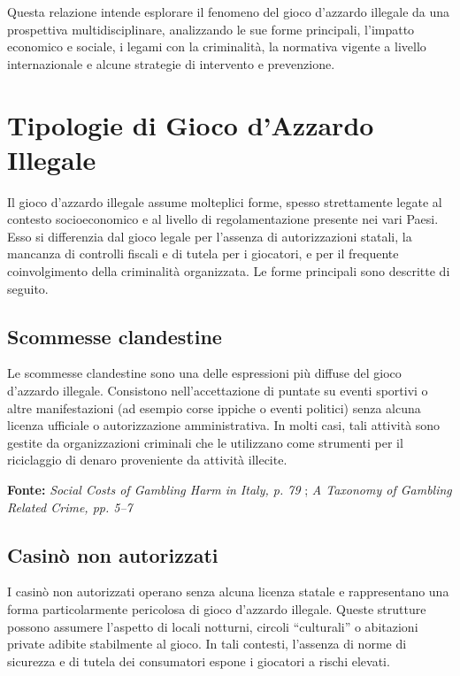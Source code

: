 \documentclass[a4paper,12pt]{article}
\begin{document}
Questa relazione intende esplorare il fenomeno del gioco d’azzardo illegale da una prospettiva multidisciplinare, analizzando le sue forme principali, l’impatto economico e sociale, i legami con la criminalità, la normativa vigente a livello internazionale e alcune strategie di intervento e prevenzione.





\section{Tipologie di Gioco d'Azzardo Illegale}

Il gioco d'azzardo illegale assume molteplici forme, spesso strettamente legate al contesto socioeconomico e al livello di regolamentazione presente nei vari Paesi. Esso si differenzia dal gioco legale per l’assenza di autorizzazioni statali, la mancanza di controlli fiscali e di tutela per i giocatori, e per il frequente coinvolgimento della criminalità organizzata. Le forme principali sono descritte di seguito.

\subsection{Scommesse clandestine}

Le scommesse clandestine sono una delle espressioni più diffuse del gioco d’azzardo illegale. Consistono nell’accettazione di puntate su eventi sportivi o altre manifestazioni (ad esempio corse ippiche o eventi politici) senza alcuna licenza ufficiale o autorizzazione amministrativa. In molti casi, tali attività sono gestite da organizzazioni criminali che le utilizzano come strumenti per il riciclaggio di denaro proveniente da attività illecite.

\textbf{Fonte:} \textit{Social Costs of Gambling Harm in Italy, p. 79} \cite{lucchini2022socialcosts}; \textit{A Taxonomy of Gambling Related Crime, pp. 5--7} \cite{banks2018taxonomy}

\subsection{Casinò non autorizzati}

I casinò non autorizzati operano senza alcuna licenza statale e rappresentano una forma particolarmente pericolosa di gioco d’azzardo illegale. Queste strutture possono assumere l’aspetto di locali notturni, circoli “culturali” o abitazioni private adibite stabilmente al gioco. In tali contesti, l’assenza di norme di sicurezza e di tutela dei consumatori espone i giocatori a rischi elevati.
\end{document}

